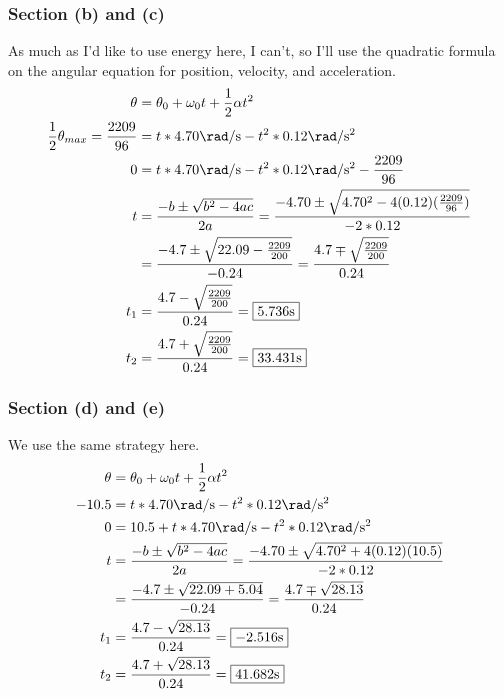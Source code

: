\documentclass[12pt]{article}
\begin{document}
\subsubsection*{Section (b) and (c)}
As much as I'd like to use energy here, I can't, so I'll use the quadratic formula on the angular equation for position, velocity, and acceleration.
\begin{align*}
    \theta  &=  \theta_0 + \omega_0 t + \frac{1}{2}\alpha t^2\\
    \frac{1}{2}\theta_{max} = \frac{2209}{96}   &=  t*4.70 \unit{\rad/\second} - t^2*0.12 \unit{\rad/\second^2}\\
    0   &=  t*4.70 \unit{\rad/\second} - t^2*0.12 \unit{\rad/\second^2} - \frac{2209}{96}\\
    t   &=  \frac{-b \pm \sqrt{b^2 - 4ac}}{2a}
        =   \frac{-4.70 \pm \sqrt{4.70^2 - 4(0.12)(\frac{2209}{96})}}{-2*0.12}\\
        &=  \frac{-4.7 \pm \sqrt{22.09 - \frac{2209}{200}}}{-0.24}
        =   \frac{4.7 \mp \sqrt{\frac{2209}{200}}}{0.24}\\
    t_1 &=  \frac{4.7 - \sqrt{\frac{2209}{200}}}{0.24}
        =   \boxed{5.736\unit{\second}}\\
    t_2 &=  \frac{4.7 + \sqrt{\frac{2209}{200}}}{0.24}
    =   \boxed{33.431\unit{\second}}
\end{align*}

\subsubsection*{Section (d) and (e)}
We use the same strategy here.
\begin{align*}
    \theta  &=  \theta_0 + \omega_0 t + \frac{1}{2}\alpha t^2\\
    -10.5   &=  t*4.70 \unit{\rad/\second} - t^2*0.12 \unit{\rad/\second^2}\\
    0   &=  10.5 + t*4.70 \unit{\rad/\second} - t^2*0.12 \unit{\rad/\second^2}\\
    t   &=  \frac{-b \pm \sqrt{b^2 - 4ac}}{2a}
        =   \frac{-4.70 \pm \sqrt{4.70^2 + 4(0.12)(10.5)}}{-2*0.12}\\
        &=  \frac{-4.7 \pm \sqrt{22.09 + 5.04}}{-0.24}
        =   \frac{4.7 \mp \sqrt{28.13}}{0.24}\\
    t_1 &=  \frac{4.7 - \sqrt{28.13}}{0.24}
        =   \boxed{-2.516\unit{\second}}\\
    t_2 &=  \frac{4.7 + \sqrt{28.13}}{0.24}
    =   \boxed{41.682\unit{\second}}
\end{align*}
\end{document}
